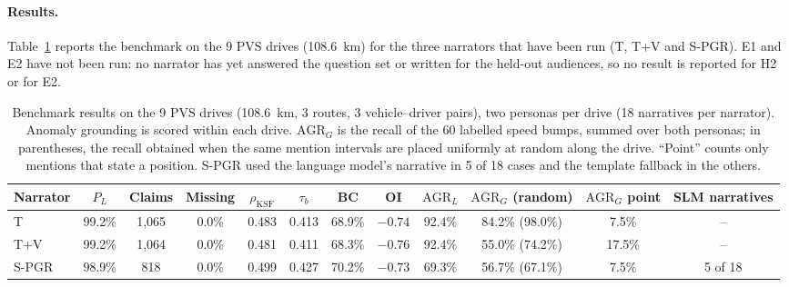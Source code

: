 \paragraph{Results.}
Table~\ref{tab:bench_results} reports the benchmark on the 9 PVS drives (108.6~km) for the three narrators that have been run (T, T+V and S-PGR).
E1 and E2 have not been run: no narrator has yet answered the question set or written for the held-out audiences, so no result is reported for H2 or for E2.

\begin{table}[t]
\caption{Benchmark results on the 9 PVS drives (108.6~km, 3 routes, 3 vehicle--driver pairs), two personas per drive (18 narratives per narrator). Anomaly grounding is scored within each drive. $\mathrm{AGR}_G$ is the recall of the 60 labelled speed bumps, summed over both personas; in parentheses, the recall obtained when the same mention intervals are placed uniformly at random along the drive. ``Point'' counts only mentions that state a position. S-PGR used the language model's narrative in 5 of 18 cases and the template fallback in the others.}
\label{tab:bench_results}
\small
\setlength{\tabcolsep}{4pt}
\centering
\begin{tabular}{@{}lccccccccccc@{}}
\toprule
Narrator & $P_L$ & Claims & Missing & $\rho_{\mathrm{KSF}}$ & $\tau_b$ & BC & OI & $\mathrm{AGR}_L$ & $\mathrm{AGR}_G$ (random) & $\mathrm{AGR}_G$ point & SLM narratives \\
\midrule
T & 99.2\% & 1{,}065 & 0.0\% & 0.483 & 0.413 & 68.9\% & $-0.74$ & 92.4\% & 84.2\% (98.0\%) & 7.5\% & -- \\
T+V & 99.2\% & 1{,}064 & 0.0\% & 0.481 & 0.411 & 68.3\% & $-0.76$ & 92.4\% & 55.0\% (74.2\%) & 17.5\% & -- \\
S-PGR & 98.9\% & 818 & 0.0\% & 0.499 & 0.427 & 70.2\% & $-0.73$ & 69.3\% & 56.7\% (67.1\%) & 7.5\% & 5 of 18 \\
\bottomrule
\end{tabular}
\end{table}

